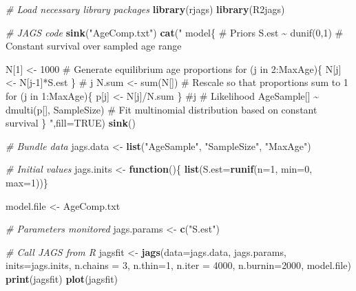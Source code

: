 \documentclass[
]{krantz}
\makeatletter
\newenvironment{Shaded}{\begin{snugshade}}{\end{snugshade}}
\newcommand{\AttributeTok}[1]{\textcolor[rgb]{0.27,0.27,0.27}{#1}}
\newcommand{\CommentTok}[1]{\textcolor[rgb]{0.37,0.37,0.37}{\textit{#1}}}
\newcommand{\ConstantTok}[1]{\textcolor[rgb]{0.37,0.37,0.37}{#1}}
\newcommand{\ControlFlowTok}[1]{\textcolor[rgb]{0.27,0.27,0.27}{\textbf{#1}}}
\newcommand{\DecValTok}[1]{\textcolor[rgb]{0.06,0.06,0.06}{#1}}
\newcommand{\FunctionTok}[1]{\textcolor[rgb]{0.27,0.27,0.27}{\textbf{#1}}}
\newcommand{\NormalTok}[1]{#1}
\newcommand{\OtherTok}[1]{\textcolor[rgb]{0.37,0.37,0.37}{#1}}
\newcommand{\StringTok}[1]{\textcolor[rgb]{0.5,0.5,0.5}{#1}}
\newenvironment{kframe}{%
\medskip{}
\setlength{\fboxsep}{.8em}
 \def\at@end@of@kframe{}%
 \ifinner\ifhmode%
  \def\at@end@of@kframe{\end{minipage}}%
  \begin{minipage}{\columnwidth}%
 \fi\fi%
 \def\FrameCommand##1{\hskip\@totalleftmargin \hskip-\fboxsep
 \colorbox{shadecolor}{##1}\hskip-\fboxsep
     \hskip-\linewidth \hskip-\@totalleftmargin \hskip\columnwidth}%
 \MakeFramed {\advance\hsize-\width
   \@totalleftmargin\z@ \linewidth\hsize
   \@setminipage}}%
 {\par\unskip\endMakeFramed%
 \at@end@of@kframe}
\renewenvironment{Shaded}{\begin{kframe}}{\end{kframe}}
\makeatother
\begin{document}
\begin{Shaded}
\begin{Highlighting}[]
\CommentTok{\# Load necessary library packages}
\FunctionTok{library}\NormalTok{(rjags)}
\FunctionTok{library}\NormalTok{(R2jags)}

\CommentTok{\# JAGS code}
\FunctionTok{sink}\NormalTok{(}\StringTok{"AgeComp.txt"}\NormalTok{)}
\FunctionTok{cat}\NormalTok{(}\StringTok{"}
\StringTok{model\{}
\StringTok{    \# Priors}
\StringTok{    S.est \textasciitilde{} dunif(0,1)  \# Constant survival over sampled age range}

\StringTok{    N[1] \textless{}{-} 1000}
\StringTok{    \# Generate equilibrium age proportions}
\StringTok{    for (j in 2:MaxAge)\{}
\StringTok{      N[j] \textless{}{-} N[j{-}1]*S.est}
\StringTok{    \} \# j}
\StringTok{    N.sum \textless{}{-} sum(N[]) \# Rescale so that proportions sum to 1}
\StringTok{    for (j in 1:MaxAge)\{}
\StringTok{    p[j] \textless{}{-} N[j]/N.sum}
\StringTok{    \} \#j}
\StringTok{    \# Likelihood}
\StringTok{    AgeSample[] \textasciitilde{} dmulti(p[], SampleSize)}
\StringTok{    \# Fit multinomial distribution based on constant survival}
\StringTok{\}}
\StringTok{    "}\NormalTok{,}\AttributeTok{fill=}\ConstantTok{TRUE}\NormalTok{)}
\FunctionTok{sink}\NormalTok{()}

\CommentTok{\# Bundle data}
\NormalTok{jags.data }\OtherTok{\textless{}{-}} \FunctionTok{list}\NormalTok{(}\StringTok{"AgeSample"}\NormalTok{, }\StringTok{"SampleSize"}\NormalTok{, }\StringTok{"MaxAge"}\NormalTok{)}

\CommentTok{\# Initial values}
\NormalTok{jags.inits }\OtherTok{\textless{}{-}} \ControlFlowTok{function}\NormalTok{()\{ }\FunctionTok{list}\NormalTok{(}\AttributeTok{S.est=}\FunctionTok{runif}\NormalTok{(}\AttributeTok{n=}\DecValTok{1}\NormalTok{, }\AttributeTok{min=}\DecValTok{0}\NormalTok{, }\AttributeTok{max=}\DecValTok{1}\NormalTok{))\}}

\NormalTok{model.file }\OtherTok{\textless{}{-}} \StringTok{\textquotesingle{}AgeComp.txt\textquotesingle{}}

\CommentTok{\# Parameters monitored}
\NormalTok{jags.params }\OtherTok{\textless{}{-}} \FunctionTok{c}\NormalTok{(}\StringTok{"S.est"}\NormalTok{)}

\CommentTok{\# Call JAGS from R}
\NormalTok{jagsfit }\OtherTok{\textless{}{-}} \FunctionTok{jags}\NormalTok{(}\AttributeTok{data=}\NormalTok{jags.data, jags.params, }\AttributeTok{inits=}\NormalTok{jags.inits,}
                \AttributeTok{n.chains =} \DecValTok{3}\NormalTok{, }\AttributeTok{n.thin=}\DecValTok{1}\NormalTok{, }\AttributeTok{n.iter =} \DecValTok{4000}\NormalTok{, }\AttributeTok{n.burnin=}\DecValTok{2000}\NormalTok{,}
\NormalTok{                model.file)}
\FunctionTok{print}\NormalTok{(jagsfit)}
\FunctionTok{plot}\NormalTok{(jagsfit)}


\end{Highlighting}
\end{Shaded}
\end{document}

